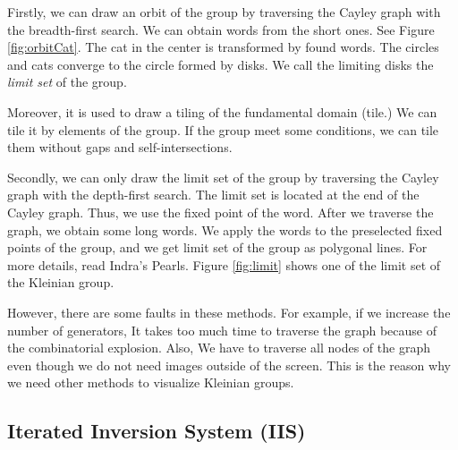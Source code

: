 Firstly, we can draw an orbit of the group by traversing the Cayley graph with
the breadth-first search. We can obtain words from the short ones.
See Figure \ref{fig:orbitCat}.%
The cat in the center is transformed by found words.
The circles and cats converge to the circle formed by disks.
We call the limiting disks the \textit{limit set} of the group.

Moreover, it is used to draw a tiling of the fundamental domain (tile.)
We can tile it by elements of the group.
If the group meet some conditions, we can tile them without gaps and
self-intersections.%

Secondly, we can only draw the limit set of the group by traversing the
Cayley graph with the depth-first search.
The limit set is located at the end of the Cayley graph. Thus, we use
the fixed point of the word.
After we traverse the graph, we obtain some long words.
We apply the words to the preselected fixed points of the group, and
we get limit set of the group as polygonal lines.
For more details, read Indra's Pearls.
Figure \ref{fig:limit} shows one of the limit set of the Kleinian group.

However, there are some faults in these methods.
For example, if we increase the number of generators,
It takes too much time to traverse the graph because of
the combinatorial explosion.
Also, We have to traverse all nodes of the graph
even though we do not need images outside of the screen.
This is the reason why we need other methods to visualize Kleinian
groups.

\subsection{Iterated Inversion System (IIS)}

